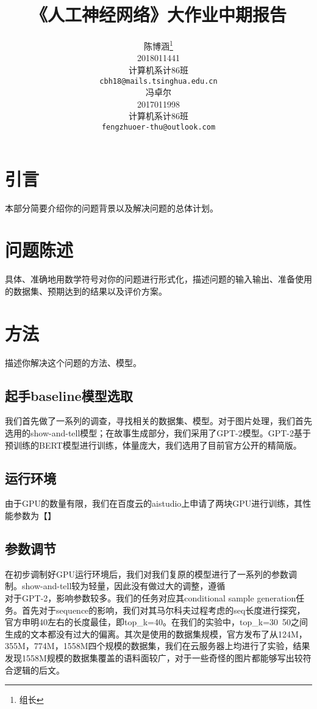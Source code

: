 \documentclass{article}
\title{《人工神经网络》大作业中期报告}
\author{%
陈博涵\thanks{组长} \\
  2018011441 \\
  计算机系计86班 \\
  \texttt{cbh18@mails.tsinghua.edu.cn} \\
  \And
  冯卓尔\\
  2017011998 \\
  计算机系计86班 \\
  \texttt{fengzhuoer-thu@outlook.com} \\
}
\begin{document}
\begin{CJK*}{UTF8}{gbsn}
\maketitle


\section{引言}

本部分简要介绍你的问题背景以及解决问题的总体计划。

\section{问题陈述}

具体、准确地用数学符号对你的问题进行形式化，描述问题的输入输出、准备使用的数据集、预期达到的结果以及评价方案。


\section{方法}

描述你解决这个问题的方法、模型。

\subsection{起手baseline模型选取}
我们首先做了一系列的调查，寻找相关的数据集、模型。对于图片处理，我们首先选用的show-and-tell模型；在故事生成部分，我们采用了GPT-2模型。GPT-2基于预训练的BERT模型进行训练，体量庞大，我们选用了目前官方公开的精简版。\\
\subsection{运行环境}
由于GPU的数量有限，我们在百度云的aistudio上申请了两块GPU进行训练，其性能参数为【】\\
\subsection{参数调节}
在初步调制好GPU运行环境后，我们对我们复原的模型进行了一系列的参数调制。show-and-tell较为轻量，因此没有做过大的调整，遵循\\
对于GPT-2，影响参数较多。我们的任务对应其conditional sample generation任务。首先对于sequence的影响，我们对其马尔科夫过程考虑的seq长度进行探究，官方申明40左右的长度最佳，即top\_k=40。在我们的实验中，top\_k=30~50之间生成的文本都没有过大的偏离。其次是使用的数据集规模，官方发布了从124M，355M，774M，1558M四个规模的数据集，我们在云服务器上均进行了实验，结果发现1558M规模的数据集覆盖的语料面较广，对于一些奇怪的图片都能够写出较符合逻辑的后文。\\

\end{CJK*}
\end{document}
